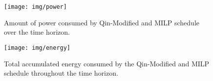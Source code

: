 \documentclass[utf8]{FrontiersinHarvard}
\begin{document}
\begin{figure}[htpb]
\centering
    \texttt{[image: img/power]}
    \caption{Amount of power consumed by Qin-Modified and MILP schedule over the time horizon.}
    \label{fig:power-usage}
\end{figure}

\begin{figure}[htpb]
\centering
    \texttt{[image: img/energy]}
    \caption{Total accumulated energy consumed by the Qin-Modified and MILP schedule throughout the time horizon.}
    \label{fig:energy-usage}
\end{figure}
\end{document}
